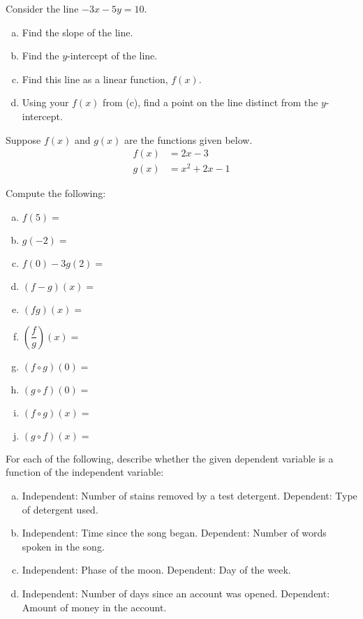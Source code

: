 \documentclass[11pt,letterpaper]{article}
\begin{document}
\newpage





\prob Consider the line $-3x - 5y= 10$.
	\begin{enumerate}[(a)]
	\item Find the slope of the line.
	\item Find the $y$-intercept of the line.
	\item Find this line as a linear function, $f(x)$.
	\item Using your $f(x)$ from (c), find a point on the line distinct from the $y$-intercept.
	\end{enumerate} \pspace  


\prob Suppose $f(x)$ and $g(x)$ are the functions given below. 
	\[
	\begin{aligned}
	f(x)&= 2x - 3 \\[0.3cm]
	g(x)&= x^2 + 2x - 1
	\end{aligned}
	\]

Compute the following: \pspace
        \begin{enumerate}[(a)]
        \item $f(5)=$ 
        \item $g(-2)=$ 
        \item $f(0) - 3g(2)=$ 
        \item $(f - g)(x)=$ 
        \item $(fg)(x)=$ 
        \item $\left( \dfrac{f}{g} \right)(x)=$ 
        \item $(f \circ g)(0)=$ 
        \item $(g \circ f)(0)=$ 
        \item $(f \circ g)(x)=$ 
        \item $(g \circ f)(x)=$ 
        \end{enumerate} \pspace  


\prob For each of the following, describe whether the given dependent variable is a function of the independent variable:
	\begin{enumerate}[(a)]
	\item Independent: Number of stains removed by a test detergent. 
		Dependent: Type of detergent used. 
	\item Independent: Time since the song began.
		Dependent: Number of words spoken in the song. 
	\item Independent: Phase of the moon.
		Dependent: Day of the week. 
	\item Independent: Number of days since an account was opened. 
		Dependent: Amount of money in the account. 
	\end{enumerate} \pspace
\end{document}
